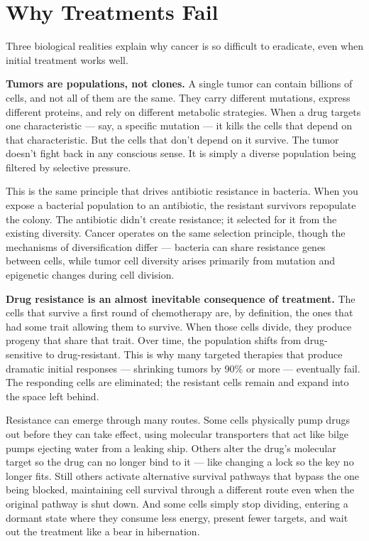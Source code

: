 \documentclass[11pt,twoside,openright]{report}
\begin{document}
\section{Why Treatments Fail}

Three biological realities explain why cancer is so difficult to eradicate, even when initial treatment works well.

\textbf{Tumors are populations, not clones.} A single tumor can contain billions of cells, and not all of them are the same. They carry different mutations, express different proteins, and rely on different metabolic strategies. When a drug targets one characteristic --- say, a specific mutation --- it kills the cells that depend on that characteristic. But the cells that don't depend on it survive. The tumor doesn't fight back in any conscious sense. It is simply a diverse population being filtered by selective pressure.

This is the same principle that drives antibiotic resistance in bacteria. When you expose a bacterial population to an antibiotic, the resistant survivors repopulate the colony. The antibiotic didn't create resistance; it selected for it from the existing diversity. Cancer operates on the same selection principle, though the mechanisms of diversification differ --- bacteria can share resistance genes between cells, while tumor cell diversity arises primarily from mutation and epigenetic changes during cell division.

\textbf{Drug resistance is an almost inevitable consequence of treatment.} The cells that survive a first round of chemotherapy are, by definition, the ones that had some trait allowing them to survive. When those cells divide, they produce progeny that share that trait. Over time, the population shifts from drug-sensitive to drug-resistant. This is why many targeted therapies that produce dramatic initial responses --- shrinking tumors by 90\% or more --- eventually fail. The responding cells are eliminated; the resistant cells remain and expand into the space left behind.

Resistance can emerge through many routes. Some cells physically pump drugs out before they can take effect, using molecular transporters that act like bilge pumps ejecting water from a leaking ship. Others alter the drug's molecular target so the drug can no longer bind to it --- like changing a lock so the key no longer fits. Still others activate alternative survival pathways that bypass the one being blocked, maintaining cell survival through a different route even when the original pathway is shut down. And some cells simply stop dividing, entering a dormant state where they consume less energy, present fewer targets, and wait out the treatment like a bear in hibernation.
\end{document}
